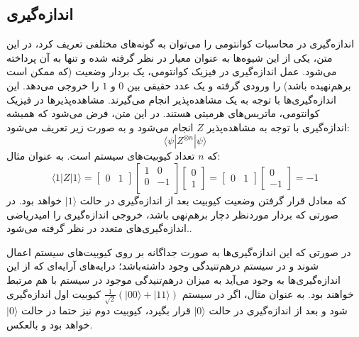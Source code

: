 \subsection{اندازه‌گیری}
اندازه‌گیری در محاسبات کوانتومی را می‌توان به گونه‌های مختلفی تعریف کرد، در این متن، یکی از این شیوه‌ها به عنوان معیار در نظر گرفته شده و تنها به آن پرداخته می‌شود.
عمل اندازه‌گیری در فیزیک کوانتومی، یک بردار وضعیت (که ممکن است برهم‌نهیده باشد) را ورودی گرفته و یک عدد حقیقی بین
$0$
و
$1$
را خروجی می‌دهد.
این اندازه‌گیری‌ها با توجه به یک مشاهده‌پذیر 
انجام می‌گیرند. مشاهده‌پذیرها در فیزیک کوانتومی، ماتریس‌های هرمیتی
هستند. در این متن، فرض می‌شود که همیشه اندازه‌گیری با توجه به مشاهده‌پذیر 
$Z$
انجام می‌شود و به صورت زیر تعریف می‌شود:
\begin{equation}
    \langle \psi| Z^{\otimes n} | \psi\rangle
\end{equation}
که
$n$
تعداد کیوبیت‌های سیستم است. به عنوان مثال:
\begin{equation}
    \langle 1 | Z | 1 \rangle = 
    \begin{bmatrix}
    0 & 1
    \end{bmatrix} 
    \begin{bmatrix}
    1 & 0 \\[3pt]
    0 & -1 \\[3pt]
    \end{bmatrix}
    \begin{bmatrix}
    0 \\[3pt] 1
    \end{bmatrix} 
    = \begin{bmatrix}
    0 & 1
    \end{bmatrix} 
    \begin{bmatrix}
    0 \\[3pt] -1
    \end{bmatrix}
    = -1
\end{equation}
که معادل قرار گرفتن وضعیت کیوبیت بعد از اندازه‌گیری در حالت 
$|1\rangle$
خواهد بود. در صورتی که بردار موردنظر دچار برهم‌نهی باشد، خروجی اندازه‌گیری را امیدریاضی اندازه‌گیری‌های متعدد در نظر گرفته می‌شود..

در صورتی که این اندازه‌گیری‌ها به صورت جداگانه بر روی کیوبیت‌های سیستم اعمال شوند و در سیستم در‌هم‌تنیدگی وجود داشته‌باشد؛ درایه‌های آرایه‌ای که از این اندازه‌گیری‌ها به وجود می‌آید به میزان درهم‌تنیدگی موجود در سیستم با هم مرتبط خواهند بود. به عنوان مثال، اگر در سیستم
$\frac{1}{\sqrt{2}} (|00\rangle + |11\rangle)$
کیوبیت اول اندازه‌گیری شود و بعد از اندازه‌گیری در حالت 
$|0\rangle$
قرار بگیرد، کیوبیت دوم نیز حتما در حالت
$|0\rangle$
خواهد بود و بالعکس.

